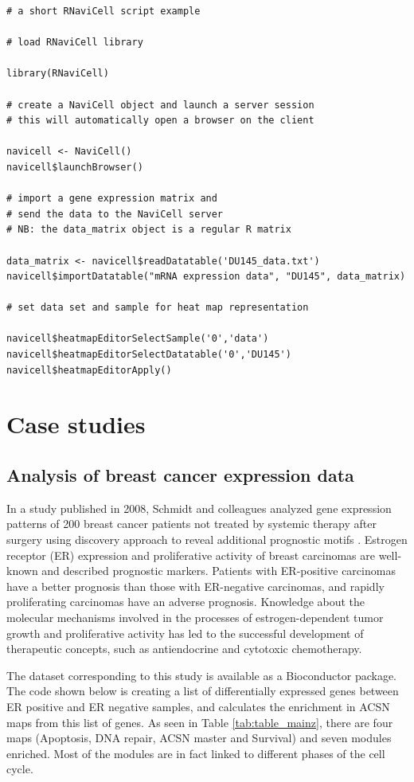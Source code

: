 \documentclass[article]{jss}
\begin{document}
\begin{verbatim}
# a short RNaviCell script example

# load RNaviCell library

library(RNaviCell)

# create a NaviCell object and launch a server session
# this will automatically open a browser on the client 

navicell <- NaviCell()
navicell$launchBrowser()

# import a gene expression matrix and 
# send the data to the NaviCell server
# NB: the data_matrix object is a regular R matrix

data_matrix <- navicell$readDatatable('DU145_data.txt')
navicell$importDatatable("mRNA expression data", "DU145", data_matrix)

# set data set and sample for heat map representation

navicell$heatmapEditorSelectSample('0','data')
navicell$heatmapEditorSelectDatatable('0','DU145')
navicell$heatmapEditorApply()

\end{verbatim}

\section[Case studies]{Case studies}

\subsection{Analysis of breast cancer expression data}
In a study published in 2008, Schmidt and colleagues analyzed gene expression
patterns of 200 breast cancer patients not treated by systemic therapy after
surgery using discovery approach to reveal additional prognostic motifs
\citep{schmidt2008humoral}. Estrogen receptor (ER) expression and proliferative
activity of breast carcinomas are well-known and described prognostic markers.
Patients with ER-positive carcinomas have a better prognosis than those with
ER-negative carcinomas, and rapidly proliferating carcinomas have an adverse
prognosis. Knowledge about the molecular mechanisms involved in the
processes of estrogen-dependent tumor growth and proliferative activity has led
to the successful development of therapeutic concepts, such as  antiendocrine and
cytotoxic chemotherapy. 

The dataset corresponding to this study is available as a Bioconductor package.
The code shown below is creating a list of differentially expressed genes
between ER positive and ER negative samples, and calculates the enrichment in
ACSN maps from this list of genes. As seen in Table \ref{tab:table_mainz}, there
are four maps (Apoptosis, DNA repair, ACSN master and Survival) and seven
modules enriched. Most of the modules are in fact linked to different phases of
the cell cycle.
\end{document}
